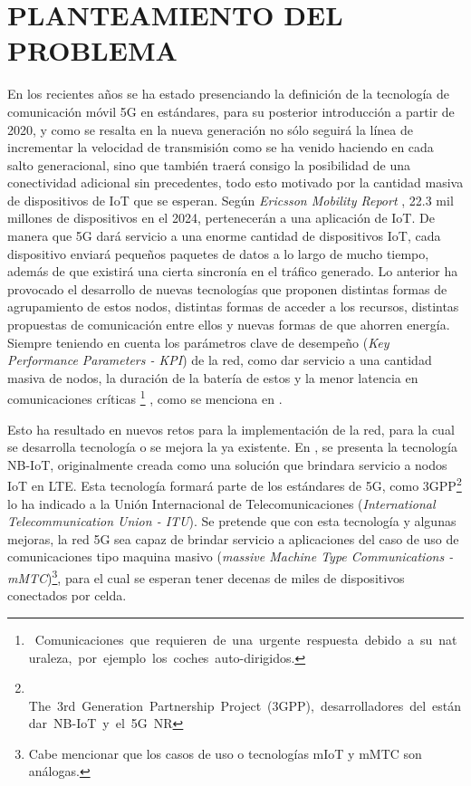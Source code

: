 
\section{PLANTEAMIENTO DEL PROBLEMA}

En los recientes años se ha estado presenciando la definición de la tecnología de comunicación móvil 5G en estándares, para su posterior introducción a partir de 2020, y como se resalta en \parencite{Fettweis2016} la nueva generación no sólo seguirá la línea de incrementar la velocidad de transmisión como se ha venido haciendo en cada salto generacional, sino que también traerá consigo la posibilidad de una conectividad adicional sin precedentes, todo esto motivado por la cantidad masiva de dispositivos de IoT que se esperan. Según \textit{Ericsson Mobility Report} \parencite{Ericsson2019}, 22.3 mil millones de dispositivos en el 2024, pertenecerán a una aplicación de IoT. De manera que 5G dará servicio a una enorme cantidad de dispositivos IoT, cada dispositivo enviará pequeños paquetes de datos a lo largo de mucho tiempo, además de que existirá una cierta sincronía en el tráfico generado. Lo anterior ha provocado el desarrollo de nuevas tecnologías que proponen distintas formas de agrupamiento de estos nodos, distintas formas de acceder a los recursos, distintas propuestas de comunicación entre ellos y nuevas formas de que ahorren energía. Siempre teniendo en cuenta los parámetros clave de desempeño (\textit{Key Performance Parameters - KPI}) de la red, como dar servicio a una cantidad masiva de nodos, la duración de la batería de estos y la menor latencia en comunicaciones críticas \footnote{\ Comunicaciones\ que\ requieren\ de\ una\ urgente\ respuesta\ debido\ a\ su\ naturaleza,\ por\ ejemplo\ los\ coches\ auto-dirigidos.} , como se menciona en \parencite{NGMN}.\newline

Esto ha resultado en nuevos retos para la implementación de la red, para la cual se desarrolla tecnología o se mejora la ya existente. En \parencite{GSMAssociation2019}, se presenta la tecnología NB-IoT, originalmente creada como una solución que brindara servicio a nodos IoT en LTE. Esta tecnología formará parte de los estándares de 5G, como 3GPP\footnote{\ $  $The\ 3rd\ Generation\ Partnership\ Project\ (3GPP),\ desarrolladores\ del\ est\textrm{\'{a}}ndar\ NB-IoT\ y\ el\ 5G\ NR}
lo ha indicado a la Unión Internacional de Telecomunicaciones (\textit{International Telecommunication Union - ITU}). Se pretende que con esta tecnología y algunas mejoras, la red 5G sea capaz de brindar servicio a aplicaciones del caso de uso de comunicaciones tipo maquina masivo (\textit{massive Machine Type Communications - mMTC})\footnote{Cabe mencionar que los casos de uso o tecnologías mIoT y mMTC son análogas.}, para el cual se esperan tener decenas de miles de dispositivos conectados por celda. \newline

